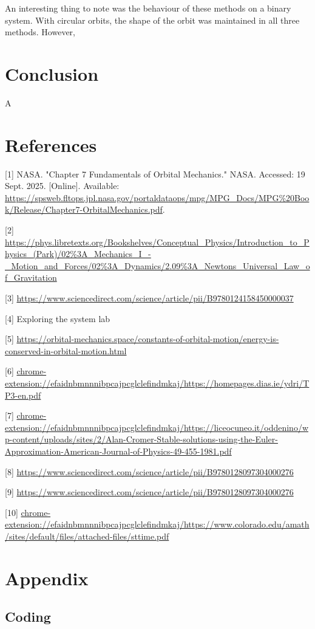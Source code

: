 \documentclass[11 pt, a4paper]{article}
\begin{document}
An interesting thing to note was the behaviour of these methods on a binary system. With circular orbits, the shape of the orbit was maintained in all three methods. However, 
\section{Conclusion}
A

\newpage
\section{References}  

[1] NASA. "Chapter 7 Fundamentals of Orbital Mechanics." NASA. Accessed: 19 Sept. 2025. [Online]. Available: \url{https://spsweb.fltops.jpl.nasa.gov/portaldataops/mpg/MPG_Docs/MPG%20Book/Release/Chapter7-OrbitalMechanics.pdf}.

[2] \url{https://phys.libretexts.org/Bookshelves/Conceptual_Physics/Introduction_to_Physics_(Park)/02%3A_Mechanics_I_-_Motion_and_Forces/02%3A_Dynamics/2.09%3A_Newtons_Universal_Law_of_Gravitation}

[3] \url{https://www.sciencedirect.com/science/article/pii/B9780124158450000037}

[4] Exploring the system lab

[5] \url{https://orbital-mechanics.space/constants-of-orbital-motion/energy-is-conserved-in-orbital-motion.html}

[6] \url{chrome-extension://efaidnbmnnnibpcajpcglclefindmkaj/https://homepages.dias.ie/ydri/TP3-en.pdf}

[7] \url{chrome-extension://efaidnbmnnnibpcajpcglclefindmkaj/https://liceocuneo.it/oddenino/wp-content/uploads/sites/2/Alan-Cromer-Stable-solutions-using-the-Euler-Approximation-American-Journal-of-Physics-49-455-1981.pdf}

[8] \url{https://www.sciencedirect.com/science/article/pii/B9780128097304000276}

[9] \url{https://www.sciencedirect.com/science/article/pii/B9780128097304000276}

[10] \url{chrome-extension://efaidnbmnnnibpcajpcglclefindmkaj/https://www.colorado.edu/amath/sites/default/files/attached-files/sttime.pdf}

\newpage
\section{Appendix}

\subsection{Coding}
\end{document}
